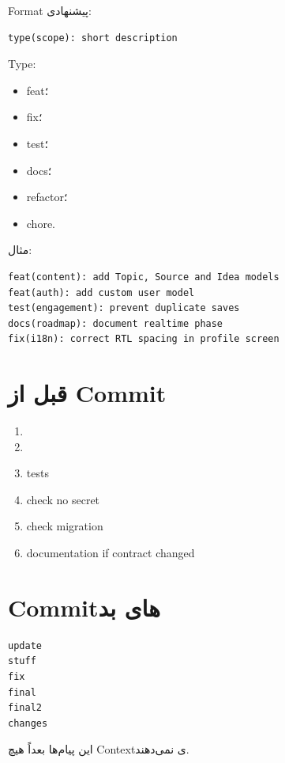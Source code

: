 Format پیشنهادی:
\begin{latin}
\begin{lstlisting}
type(scope): short description
\end{lstlisting}
\end{latin}

Type:
\begin{itemize}
  \item feat؛
  \item fix؛
  \item test؛
  \item docs؛
  \item refactor؛
  \item chore.
\end{itemize}

مثال:
\begin{latin}
\begin{lstlisting}
feat(content): add Topic, Source and Idea models
feat(auth): add custom user model
test(engagement): prevent duplicate saves
docs(roadmap): document realtime phase
fix(i18n): correct RTL spacing in profile screen
\end{lstlisting}
\end{latin}

\section{قبل از Commit}

\begin{enumerate}
  \item {}
  \item {}
  \item tests
  \item check no secret
  \item check migration
  \item documentation if contract changed
\end{enumerate}

\section{Commitهای بد}

\begin{latin}
\begin{lstlisting}
update
stuff
fix
final
final2
changes
\end{lstlisting}
\end{latin}

این پیام‌ها بعداً هیچ Contextی نمی‌دهند.

